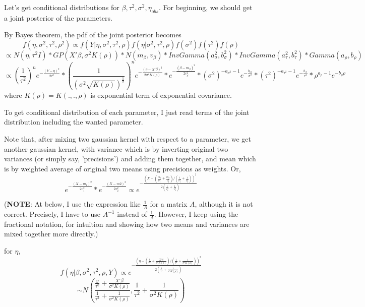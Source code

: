 \documentclass{article}
\begin{document}
Let's get conditional distributions for $\beta, \tau^2, \sigma^2, \eta_{obs}$.
For beginning, we should get a joint posterior of the parameters.

By Bayes theorem, the pdf of the joint posterior becomes
\[f(\eta,\sigma^2,\tau^2,\rho^2)
    \propto f(Y|\eta,\sigma^2,\tau^2,\rho)f(\eta|\sigma^2,\tau^2,\rho)f(\sigma^2)f(\tau^2)f(\rho)\]
\[\propto N(\eta,\tau^2I) * GP(X'\beta, \sigma^2 K(\rho))
    * N(m_\beta,v_\beta) * InvGamma(a_\sigma^2, b_\sigma^2) * InvGamma(a_\tau^2, b_\tau^2)
    * Gamma(a_\rho, b_\rho) \]
\[\propto (\frac{1}{\tau^2})^n e^{-\frac{(Y-\eta)^2}{2\tau^2}}
    * (\frac{1}{(\sigma^2 \sqrt{K(\rho)})^{\frac{1}{2}}})^n e^{-\frac{(\eta-X'\beta)^2}{2\sigma^2 K(\rho)}}
    * e^{-\frac{(\beta-m_\beta)^2}{2v_\beta^2}}
    * (\sigma^2)^{-a_{\sigma^2}-1} e^{-\frac{b_{\sigma^2}}{\sigma^2}}
    * (\tau^2)^{-a_{\tau^2}-1} e^{-\frac{b_{\tau^2}}{\tau^2}}
    * \rho^{a_{\rho}-1} e^{-b_{\rho}\rho}
    \]
where $K(\rho)=K(.,.,\rho)$ is exponential term of exponential covariance.

To get conditional distribution of each parameter, I just read terms of the joint distribution
including the wanted parameter. 

Note that, after mixing two gaussian kernel with respect to a parameter,
we get another gaussian kernel, with variance which is by inverting original two variances (or simply say, 'precisions') and adding them together,
and mean which is by weighted average of original two means using precisions as weights. Or,
\[e^{-\frac{(X-m_1)^2}{2v_1^2}} * e^{-\frac{(X-m2)^2}{2v_2^2}}
    \propto e^{-\frac{(X-(\frac{m_1}{v_1^2} + \frac{m_2}{v_2^2})/(\frac{1}{v_1^2} + \frac{1}{v_2^2}))^2}{2(\frac{1}{v_1^2}+\frac{1}{v_2^2})}}\]

\clearpage
(\textbf{NOTE}: At below, I use the expression like $\frac{1}{A}$ for a matrix $A$, although it is not correct. 
Precisely, I have to use $A^{-1}$ instead of $\frac{1}{A}$.
However, I keep using the fractional notation, for intuition and showing how two means and variances are mixed together more directly.)

for $\eta$,
\[f(\eta|\beta,\sigma^2,\tau^2,\rho,Y) \propto e^{-\frac{(\eta - (\frac{y}{\tau^2} + \frac{X'\beta}{\sigma^2 K(\rho)}) / (\frac{1}{\tau^2}+\frac{1}{\sigma^2 K(\rho)}))^2}{2(\frac{1}{\tau^2}+\frac{1}{\sigma^2 K(\rho)})}}
\]
\[\sim N(\frac{\frac{y}{\tau^2} + \frac{X'\beta}{\sigma^2 K(\rho)}}{\frac{1}{\tau^2}+\frac{1}{\sigma^2 K(\rho)}}, \frac{1}{\tau^2}+\frac{1}{\sigma^2 K(\rho)})\]
\end{document}
